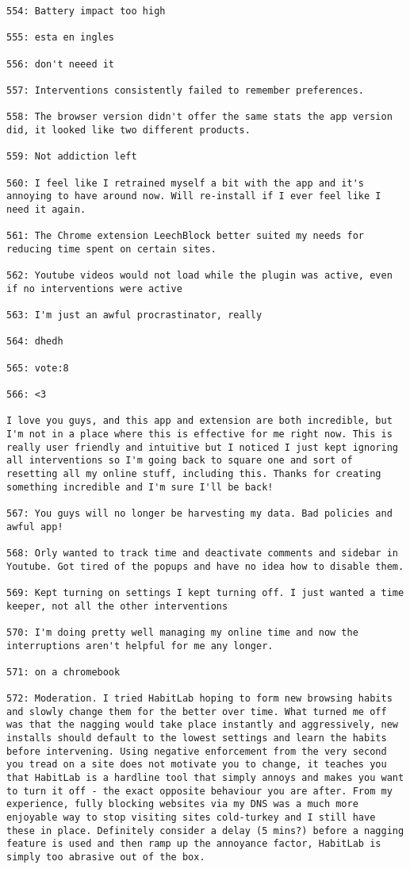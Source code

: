 \begin{lstlisting}[breaklines]
554: Battery impact too high

555: esta en ingles

556: don't neeed it

557: Interventions consistently failed to remember preferences.

558: The browser version didn't offer the same stats the app version did, it looked like two different products.

559: Not addiction left

560: I feel like I retrained myself a bit with the app and it's annoying to have around now. Will re-install if I ever feel like I need it again.

561: The Chrome extension LeechBlock better suited my needs for reducing time spent on certain sites.

562: Youtube videos would not load while the plugin was active, even if no interventions were active

563: I'm just an awful procrastinator, really

564: dhedh

565: vote:8

566: <3

I love you guys, and this app and extension are both incredible, but I'm not in a place where this is effective for me right now. This is really user friendly and intuitive but I noticed I just kept ignoring all interventions so I'm going back to square one and sort of resetting all my online stuff, including this. Thanks for creating something incredible and I'm sure I'll be back!

567: You guys will no longer be harvesting my data. Bad policies and awful app!

568: Orly wanted to track time and deactivate comments and sidebar in Youtube. Got tired of the popups and have no idea how to disable them.

569: Kept turning on settings I kept turning off. I just wanted a time keeper, not all the other interventions

570: I'm doing pretty well managing my online time and now the interruptions aren't helpful for me any longer.

571: on a chromebook

572: Moderation. I tried HabitLab hoping to form new browsing habits and slowly change them for the better over time. What turned me off was that the nagging would take place instantly and aggressively, new installs should default to the lowest settings and learn the habits before intervening. Using negative enforcement from the very second you tread on a site does not motivate you to change, it teaches you that HabitLab is a hardline tool that simply annoys and makes you want to turn it off - the exact opposite behaviour you are after. From my experience, fully blocking websites via my DNS was a much more enjoyable way to stop visiting sites cold-turkey and I still have these in place. Definitely consider a delay (5 mins?) before a nagging feature is used and then ramp up the annoyance factor, HabitLab is simply too abrasive out of the box.


\end{lstlisting}
